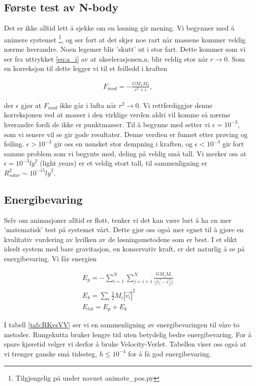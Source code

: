 \documentclass[11pt]{article}
\begin{document}
\begin{multicols}{2}

\subsection{Første test av N-body}
\label{sec:forste-test-epsilon}
Det er ikke alltid lett å sjekke om en løsning gir mening. Vi begynner med
å animere systemet \footnote{Tilgjengelig på \cite{github-repo} under navnet
animate\_pos.py}, og ser fort at det skjer noe rart når massene kommer veldig
nærme hverandre. Noen legemer blir 'skutt' ut i stor fart. Dette kommer som
vi ser fra uttrykket \eqref{eq:a_i} av at akselerasjonen,$a$, blir veldig
stor når $r \rightarrow 0$.
Som en korreksjon til dette legger vi til et feilledd i kraften

\begin{align}
F_{mod} = -\frac{GM_1M_2}{r^2 + \epsilon},
\end{align}

der $\epsilon$ gjør at $F_{mod}$ ikke går i lufta når $r^2 \rightarrow 0$. Vi 
rettferdiggjør denne korreksjonen ved at masser i den virklige
verden aldri vil komme så nærme hverandre fordi de ikke er punktmasser.
Til å begynne med setter vi $\epsilon = 10^{-3}$, som vi senere vil se gir
gode resultater. Denne verdien er funnet etter prøving og feiling. 
$\epsilon > 10^{-3}$ gir oss en uønsket stor dempning i kraften, og 
$\epsilon < 10^{-3}$ gir fort samme problem som vi begynte med, deling på
veldig små tall. Vi merker oss at $\epsilon = 10^{-3} {ly}^2$ (light years) er et veldig 
stort tall, til sammenligning er $R_{solar}^2 \sim 10^{-15} {ly}^2$. 

\subsection{Energibevaring}
Selv om animasjoner alltid er flott, tenker vi det kan være lurt å ha en mer
'matematisk' test på systemet vårt. Dette gjør oss også mer egnet til
å gjøre en kvalitativ vurdering av hvilken av de løsningsmetodene som er best.
I et slikt ideelt system med bare 
gravitasjon, en konservativ kraft, er det naturlig å se på energibevaring. Vi får
energien

\begin{align}
E_{p} = - \sum_{i = 1}^{N} \sum_{j = i+1}^{N} \frac{GM_jM_i}{{||\vec{r_i} - \vec{r_j}||}} \\
E_{k} = \sum_{i} \frac{1}{2}M_i|\vec{v_i}|^2 \\
E_{tot} = E_{p} + E_{k}
\end{align}

I tabell \ref{tab:RKvsVV} ser vi en sammenligning av energibevaringen til 
våre to metoder. Rungekutta bruker lengre tid uten betydelig bedre 
energibevaring. For å spare kjøretid velger vi derfor å bruke 
Velocity-Verlet. Tabellen viser oss også at vi trenger ganske små tidssteg,
$h \leq 10 ^{-4}$ for å få god energibevaring.

\end{multicols}
\end{document}

